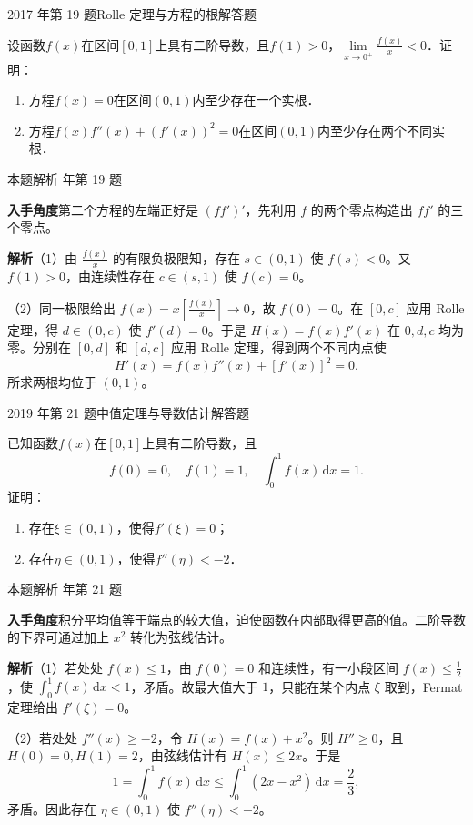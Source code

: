 \documentclass[UTF8,zihao=-4,fontset=fandol]{ctexart}
\renewcommand{\lim}{\operatorname*{lim}\limits}
\newcommand{\QuestionPage}[6]{%
  \par\noindent\begin{minipage}{\linewidth}
  \raggedright
  {\small\textcolor{black!60}{#3\quad #5}\hfill\textcolor{accent}{#2}}\par\smallskip}
\newcommand{\QuestionEnd}{\end{minipage}\par\medskip}
\newcommand{\QuestionPage}[6]{%
  \clearpage
  {\small\textcolor{accent}{#1\hfill #2}}\par\medskip
  {\small\textcolor{black!60}{#3\quad #5\hfill #6}}\par\vspace{9bp}}
\newcommand{\QuestionEnd}{}
\newenvironment{QuestionSolution}[1]{%
  \clearpage
  {\small\textcolor{black!60}{本题解析\quad #1}}\par\medskip
}{\par\clearpage}
\begin{document}
\QuestionPage{2.4 微分中值定理及其应用}{解答题}{2017 年第 19 题}{3}{Rolle 定理与方程的根}{092 / 234}
设函数$f(x)$在区间$[0,1]$上具有二阶导数，且$f(1) > 0$，$\lim_{x \to 0^+} \frac{f(x)}{x} < 0$．证明：
\begin{enumerate}
\item 方程$f(x) = 0$在区间$(0,1)$内至少存在一个实根．
\item 方程$f(x)f''(x) + \left(f'(x) \right)^2 = 0$在区间$(0,1)$内至少存在两个不同实根．
\end{enumerate}
\QuestionEnd

\begin{QuestionSolution}{2017 年第 19 题}
\textbf{入手角度}\quad 第二个方程的左端正好是 \((ff')'\)，先利用 \(f\) 的两个零点构造出 \(ff'\) 的三个零点。

\textbf{解析}\quad （1）由 \(\frac{f(x)}{x}\) 的有限负极限知，存在 \(s\in(0,1)\) 使 \(f(s)<0\)。又 \(f(1)>0\)，由连续性存在 \(c\in(s,1)\) 使 \(f(c)=0\)。

（2）同一极限给出 \(f(x)=x[\frac{f(x)}{x}]\to0\)，故 \(f(0)=0\)。在 \([0,c]\) 应用 Rolle 定理，得 \(d\in(0,c)\) 使 \(f'(d)=0\)。于是 \(H(x)=f(x)f'(x)\) 在 \(0,d,c\) 均为零。分别在 \([0,d]\) 和 \([d,c]\) 应用 Rolle 定理，得到两个不同内点使
\[
H'(x)=f(x)f''(x)+[f'(x)]^2=0.
\]
所求两根均位于 \((0,1)\)。
\end{QuestionSolution}

\QuestionPage{2.4 微分中值定理及其应用}{解答题}{2019 年第 21 题}{4}{中值定理与导数估计}{093 / 234}
已知函数$f(x)$在$[0,1]$上具有二阶导数，且
\[
f(0) = 0,\quad f(1) = 1,\quad \int_0^1 f(x)\,\mathrm{d} x = 1.
\]
证明：
\begin{enumerate}
\item 存在$\xi \in(0,1)$，使得$f'(\xi) = 0$；
\item 存在$\eta \in(0,1)$，使得$f''(\eta) < - 2$．
\end{enumerate}
\QuestionEnd

\begin{QuestionSolution}{2019 年第 21 题}
\textbf{入手角度}\quad 积分平均值等于端点的较大值，迫使函数在内部取得更高的值。二阶导数的下界可通过加上 \(x^2\) 转化为弦线估计。

\textbf{解析}\quad （1）若处处 \(f(x)\le1\)，由 \(f(0)=0\) 和连续性，有一小段区间 \(f(x)\le\frac{1}{2}\)，使 \(\int_0^1 f(x)\,\mathrm{d}x<1\)，矛盾。故最大值大于 \(1\)，只能在某个内点 \(\xi\) 取到，Fermat 定理给出 \(f'(\xi)=0\)。

（2）若处处 \(f''(x)\ge-2\)，令 \(H(x)=f(x)+x^2\)。则 \(H''\ge0\)，且 \(H(0)=0,H(1)=2\)，由弦线估计有 \(H(x)\le2x\)。于是
\[
1=\int_0^1 f(x)\,\mathrm{d}x\le\int_0^1(2x-x^2)\,\mathrm{d}x=\frac23,
\]
矛盾。因此存在 \(\eta\in(0,1)\) 使 \(f''(\eta)<-2\)。
\end{QuestionSolution}
\end{document}
